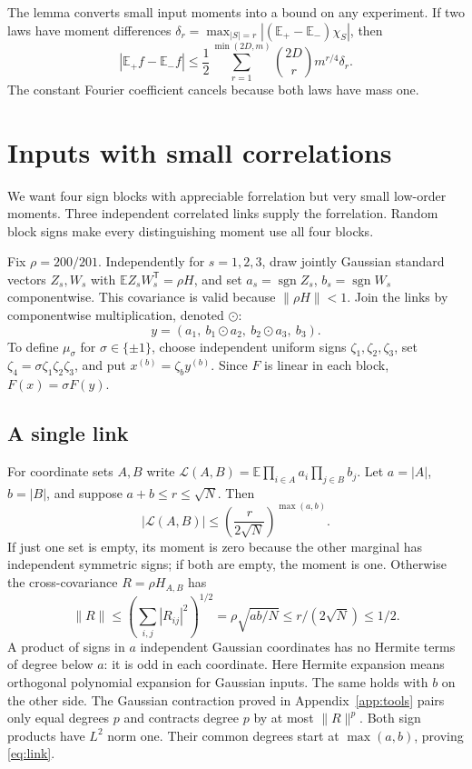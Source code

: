 \documentclass[11pt]{article}
\newcommand{\E}{\mathbb E}
\newcommand{\sgn}{\operatorname{sgn}}
\newcommand{\1}{\mathbf 1}
\begin{document}
The lemma converts small input moments into a bound on any experiment.
If two laws have moment differences
$\delta_r=\max_{|S|=r}|(\E_+-\E_-)\chi_S|$, then
\begin{equation}\label{eq:collection}
 |\E_+f-\E_-f|
 \le\frac12\sum_{r=1}^{\min(2D,m)}\binom{2D}{r}m^{r/4}\delta_r.
\end{equation}
The constant Fourier coefficient cancels because both laws have mass one.

\section{Inputs with small correlations}\label{sec:gaussian}
We want four sign blocks with appreciable forrelation but very small
low-order moments. Three independent correlated links supply the
forrelation. Random block signs make every distinguishing moment use
all four blocks.

Fix $\rho=200/201$. Independently for $s=1,2,3$, draw jointly Gaussian
standard vectors $Z_s,W_s$ with
$\E Z_sW_s^{\mathsf T}=\rho H$, and set
$a_s=\sgn Z_s$, $b_s=\sgn W_s$ componentwise.
This covariance is valid because $\|\rho H\|<1$.
Join the links by componentwise multiplication, denoted $\odot$:
\[
          y=(a_1,\ b_1\odot a_2,\ b_2\odot a_3,\ b_3).
\]
To define $\mu_\sigma$ for $\sigma\in\{\pm1\}$, choose independent
uniform signs $\zeta_1,\zeta_2,\zeta_3$, set
$\zeta_4=\sigma\zeta_1\zeta_2\zeta_3$, and put $x^{(b)}=\zeta_b y^{(b)}$.
Since $F$ is linear in each block, $F(x)=\sigma F(y)$.

\subsection{A single link}
For coordinate sets $A,B$ write
$\mathcal L(A,B)=\E\prod_{i\in A}a_i\prod_{j\in B}b_j$.
Let $a=|A|$, $b=|B|$, and suppose $a+b\le r\le\sqrt N$.
Then
\begin{equation}\label{eq:link}
 |\mathcal L(A,B)|\le
       \left(\frac{r}{2\sqrt N}\right)^{\max(a,b)}.
\end{equation}
If just one set is empty, its moment is zero because the other marginal
has independent symmetric signs; if both are empty, the moment is one.
Otherwise the cross-covariance $R=\rho H_{A,B}$ has
\[
 \|R\|\le\left(\sum_{i,j}|R_{ij}|^2\right)^{1/2}=\rho\sqrt{ab/N}
                         \le r/(2\sqrt N)\le1/2.
\]
A product of signs in $a$ independent Gaussian coordinates has no
Hermite terms of degree below $a$: it is odd in each coordinate.
Here Hermite expansion means orthogonal polynomial expansion for Gaussian inputs.
The same holds with $b$ on the other side. The Gaussian contraction
proved in Appendix~\ref{app:tools} pairs only equal degrees $p$ and
contracts degree $p$ by at most $\|R\|^p$. Both sign products have
$L^2$ norm one. Their common degrees start at $\max(a,b)$, proving
\eqref{eq:link}.
\end{document}
